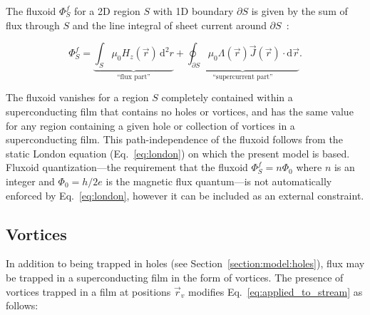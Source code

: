 \documentclass[final,3p,times]{elsarticle}
\begin{document}
The fluxoid $\Phi^f_S$ for a 2D region $S$ with 1D boundary $\partial S$ is given by the sum of flux through $S$ and the line integral of sheet current around $\partial S$~\cite{Brandt2005-wj,Clem2005-ye,Tinkham2004-zn}:

\begin{equation}
    \Phi^f_S = \underbrace{\int_S\mu_0H_z(\vec{r})\,\mathrm{d}^2r}_\text{``flux part''} + \underbrace{\oint_{\partial S}\mu_0\Lambda(\vec{r})\vec{J}(\vec{r})\cdot\mathrm{d}\vec{r}}_\text{``supercurrent part''}.
    \label{eq:fluxoid}
\end{equation}

The fluxoid vanishes for a region $S$ completely contained within a superconducting film that contains no holes or vortices, and has the same value for any region containing a given hole or collection of vortices in a superconducting film. This path-independence of the fluxoid follows from the static London equation (Eq.~\ref{eq:london}) on which the present model is based. Fluxoid quantization---the requirement that the fluxoid $\Phi^f_S=n\Phi_0$ where $n$ is an integer and $\Phi_0=h/2e$ is the magnetic flux quantum---is not automatically enforced by Eq.~\ref{eq:london}, however it can be included as an external constraint.

\subsection{Vortices}
\label{section:model:vortices}
In addition to being trapped in holes (see Section~\ref{section:model:holes}), flux may be trapped in a superconducting film in the form of vortices. The presence of vortices trapped in a film at positions $\vec{r}_v$ modifies Eq.~\ref{eq:applied_to_stream} as follows:
\end{document}
